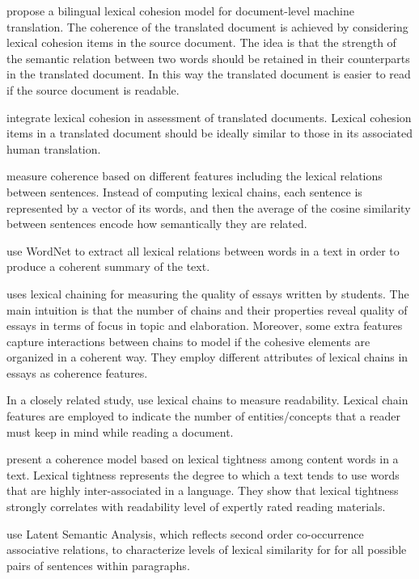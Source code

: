  propose a bilingual lexical cohesion model for document-level machine translation.  
The coherence of the translated document is achieved by considering lexical cohesion items in the source document. 
The idea is that the strength of the semantic relation between two words should be retained in their counterparts in the translated document. 
In this way the translated document is easier to read if the source document is readable. 

 integrate lexical cohesion in assessment of translated documents. 
Lexical cohesion items in a translated document should be ideally similar to those in its associated human translation. 

 measure coherence based on different features including the lexical relations between sentences. 
Instead of computing lexical chains, each sentence is represented by a vector of its words, and then the average of the cosine similarity between sentences encode how semantically they are related. 

 use WordNet to extract all lexical relations between words in a text in order to produce a coherent summary of the text.  

 uses lexical chaining for measuring the quality of essays written by students. 
The main intuition is that the number of chains and their properties reveal quality of essays in terms of focus in topic and elaboration. 
Moreover, some extra features capture interactions between chains to model if the cohesive elements are organized in a coherent way. 
They employ different attributes of lexical chains in essays as coherence features. 


In a closely related study,  use lexical chains to measure readability. 
Lexical chain features are employed to indicate the number of entities/concepts that a reader must keep in mind while reading a document.  

 present a coherence model based on lexical tightness among content words in a text. 
Lexical tightness represents the degree to which a text tends to use words that are highly inter-associated in a language. 
They show that lexical tightness strongly correlates with readability level of expertly rated reading materials. 

 use Latent Semantic Analysis, which reflects second order co-occurrence associative relations, to characterize levels of lexical similarity for  for all possible pairs of sentences within paragraphs. 

